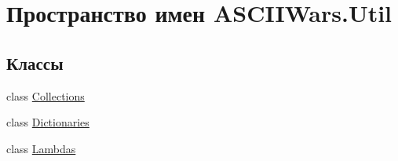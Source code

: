 \hypertarget{namespace_a_s_c_i_i_wars_1_1_util}{}\section{Пространство имен A\+S\+C\+I\+I\+Wars.\+Util}
\label{namespace_a_s_c_i_i_wars_1_1_util}
\subsection*{Классы}
\begin{DoxyCompactItemize}
\item 
class \hyperlink{class_a_s_c_i_i_wars_1_1_util_1_1_collections}{Collections}
\item 
class \hyperlink{class_a_s_c_i_i_wars_1_1_util_1_1_dictionaries}{Dictionaries}
\item 
class \hyperlink{class_a_s_c_i_i_wars_1_1_util_1_1_lambdas}{Lambdas}
\end{DoxyCompactItemize}
